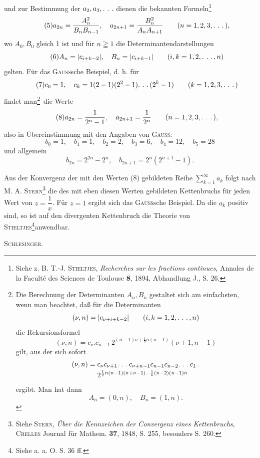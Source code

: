 \noindent und zur Bestimmung der \(a_2,a_3,\ldotp\,\ldotp\,\ldotp\) dienen die bekannten Formeln\footnote{Siehe z. B. T.-J. \textsc{Stieltjes}, \textit{Recherches sur les fractions continues}, Annales de la Faculté des Sciences de Toulouse \textbf{8}, 1894, Abhandlung J., S. 26.}
\begin{equation*}\tag*{(5)}
a_{2n}=\frac{A_n^2}{B_nB_{n-1}},\quad a_{2n+1}=\frac{B_n^2}{A_nA_{n+1}}\qquad(n=1,2,3,\ldotp\,\ldotp\,\ldotp),
\end{equation*}
\noindent wo \(A_0,B_0\) gleich 1 ist und für \(n\geqq1\) die Determinantendarstellungen
\begin{equation*}\tag*{(6)}
A_n=|c_{i+k-2}|,\quad B_n=|c_{i+k-1}|\qquad(i,k=1,2,\ldotp\,\ldotp\,\ldotp,n)
\end{equation*}
\noindent gelten. Für das \textsc{Gauss}sche Beispiel, d. h. für
\begin{equation*}\tag*{(7)}
c_0=1,\quad c_k=1(2-1)(2^2-1)\ldotp\,\ldotp\,\ldotp(2^k-1)\qquad(k=1,2,3,\ldotp\,\ldotp\,\ldotp)
\end{equation*}
\noindent findet man\begingroup\renewcommand{\thefootnote}{**)}\footnote{Die Berechnung der Determinanten \(A_n,B_n\) gestaltet sich am einfachsten, wenn man beachtet, daß für die Determinanten
\[
(\nu,n)=|c_{\nu+i+k-2}|\qquad(i,k=1,2,\ldotp\,\ldotp\,\ldotp,n)
\]
die Rekursionsformel
\[
(\nu,n)=c_\nu.c_{n-1}\,2^{(n-1)\nu+\frac12n(n-1)}(\nu+1,n-1)
\]
gilt, aus der sich sofort
\[
\begin{aligned}
(\nu,n)={}&c_\nu c_{\nu+1}\ldotp\,\ldotp\,\ldotp c_{\nu+n-1}c_{n-1}c_{n-2}\ldotp\,\ldotp\,\ldotp c_1\,.
\\[-2pt]&2^{\frac12n(n-1)(n+\nu-1)-\frac16(n-2)(n-1)n}
\end{aligned}
\]
ergibt. Man hat dann
\[
A_n=(0,n),\quad B_n=(1,n).
\]
}\endgroup\ die Werte
\begin{equation*}\tag*{(8)}
a_{2n}=\frac1{2^n-1},\quad a_{2n+1}=\frac1{2^n}\qquad(n=1,2,3,\ldotp\,\ldotp\,\ldotp),
\end{equation*}
\noindent also in Übereinstimmung mit den Angaben von \textsc{Gauss}:
\[
b_0=1,\quad b_1=1,\quad b_2=2,\quad b_3=6,\quad b_4=12,\quad b_5=28
\]
\noindent und allgemein
\[
b_{2n}=2^{2n}-2^n,\quad b_{2n+1}=2^n(2^{n+1}-1).
\]
\par\endgroup

\clearpage{}
\begingroup\small\makeatletter\let\veqno\@@leqno\makeatother
\noindent Aus der Konvergenz der mit den Werten (8) gebildeten Reihe \(\displaystyle\sum_{k=1}^{\infty}a_k\) folgt nach M. A. \textsc{Stern}\footnote{Siehe \textsc{Stern}, \textit{Über die Kennzeichen der Convergenz eines Kettenbruchs}, \textsc{Crelles} Journal für Mathem. \textbf{37}, 1848, S. 255, besonders S. 260.} die  des mit eben diesen Werten gebildeten Kettenbruchs für jeden Wert von \(z=\dfrac1x\). Für \(z=1\) ergibt sich das \textsc{Gauss}sche Beispiel. Da die \(a_k\) positiv sind, so ist auf den divergenten Kettenbruch die Theorie von \textsc{Stieltjes}\begingroup\renewcommand{\thefootnote}{**)}\footnote{Siehe a. a. O. S. 36 ff.}\endgroup anwendbar.
\par\noindent\hfill\textsc{Schlesinger}.
\par\endgroup
